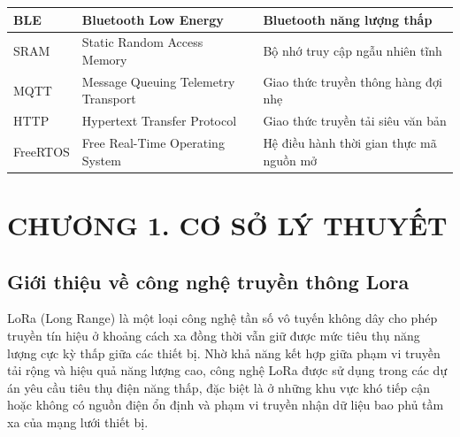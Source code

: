 \documentclass{article}
\begin{document}
\begin{table}[h!]
\begin{tabular}{|>{\centering\arraybackslash}p{2.5cm}
				|>{\centering\arraybackslash}p{6cm}
				|>{\centering\arraybackslash}p{6cm}|}
			BLE & Bluetooth Low Energy & Bluetooth năng lượng thấp \\ \hline
			SRAM & Static Random Access Memory & Bộ nhớ truy cập ngẫu nhiên tĩnh \\ \hline
			MQTT & Message Queuing Telemetry Transport & Giao thức truyền thông hàng đợi nhẹ \\ \hline
			HTTP & Hypertext Transfer Protocol & Giao thức truyền tải siêu văn bản \\ \hline
			FreeRTOS & Free Real-Time Operating System & Hệ điều hành thời gian thực mã nguồn mở \\ \hline
		\end{tabular}
	\end{table}
	
	\newpage
	
	
	\renewcommand{\listfigurename}{DANH MỤC HÌNH VẼ}
	{\let\oldnumberline\numberline
		\renewcommand{\numberline}{Hình~\oldnumberline}
		\listoffigures} 
	\newpage
	
	
	\renewcommand{\listtablename}{DANH MỤC BẢNG BIỂU}
	{\let\oldnumberline\numberline
		\renewcommand{\numberline}{Bảng~\oldnumberline}
		\listoftables}
	\newpage
	
	
	\section*{CHƯƠNG 1. CƠ SỞ LÝ THUYẾT}
	\setcounter{section}{1}
	\setcounter{subsection}{0}
	\setcounter{figure}{0}
	\setcounter{table}{0}
	\setcounter{equation}{0}
	\subsection{Giới thiệu về công nghệ truyền thông Lora}
	
	LoRa (Long Range) là một loại công nghệ tần số vô tuyến không dây cho phép truyền tín hiệu ở khoảng cách xa đồng thời vẫn giữ được mức tiêu thụ năng lượng cực kỳ thấp giữa các thiết bị. Nhờ khả năng kết hợp giữa phạm vi truyền tải rộng và hiệu quả năng lượng cao, công nghệ LoRa được sử dụng trong các dự án yêu cầu tiêu thụ điện năng thấp, đặc biệt là ở những khu vực khó tiếp cận hoặc không có nguồn điện ổn định và phạm vi truyền nhận dữ liệu bao phủ tầm xa của mạng lưới thiết bị.
	
\end{document}
